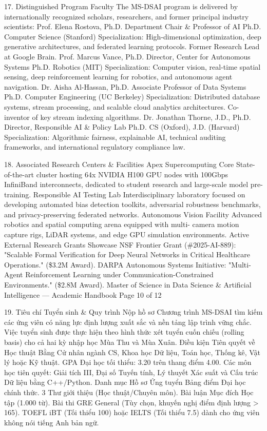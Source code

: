 \documentclass[12pt]{article}
\begin{document}
17. Distinguished Program Faculty
The MS-DSAI program is delivered by internationally recognized scholars, researchers, and former principal industry
scientists:
Prof. Elena Rostova, Ph.D.
Department Chair \& Professor of AI
Ph.D. Computer Science (Stanford)
Specialization: High-dimensional optimization, deep generative
architectures, and federated learning protocols. Former
Research Lead at Google Brain.
Prof. Marcus Vance, Ph.D.
Director, Center for Autonomous Systems
Ph.D. Robotics (MIT)
Specialization: Computer vision, real-time spatial sensing, deep
reinforcement learning for robotics, and autonomous agent
navigation.
Dr. Aisha Al-Hassan, Ph.D.
Associate Professor of Data Systems
Ph.D. Computer Engineering (UC Berkeley)
Specialization: Distributed database systems, stream
processing, and scalable cloud analytics architectures. Co-
inventor of key stream indexing algorithms.
Dr. Jonathan Thorne, J.D., Ph.D.
Director, Responsible AI \& Policy Lab
Ph.D. CS (Oxford), J.D. (Harvard)
Specialization: Algorithmic fairness, explainable AI, technical
auditing frameworks, and international regulatory compliance
law.

18. Associated Research Centers \& Facilities
Apex Supercomputing Core
State-of-the-art cluster hosting 64x
NVIDIA H100 GPU nodes with 100Gbps
InfiniBand interconnects, dedicated to
student research and large-scale model
pre-training.
Responsible AI Testing Lab
Interdisciplinary laboratory focused on
developing automated bias detection
toolkits, adversarial robustness
benchmarks, and privacy-preserving
federated networks.
Autonomous Vision Facility
Advanced robotics and spatial
computing arena equipped with multi-
camera motion capture rigs, LiDAR
systems, and edge GPU simulation
environments.
Active External Research Grants Showcase
NSF Frontier Grant (\#2025-AI-889): "Scalable Formal Verification for Deep Neural Networks in Critical Healthcare
Operations." (\$3.2M Award).
DARPA Autonomous Systems Initiative: "Multi-Agent Reinforcement Learning under Communication-Constrained
Environments." (\$2.8M Award).
Master of Science in Data Science \& Artificial Intelligence — Academic Handbook
Page 10 of 12


19. Tiêu chí Tuyển sinh \& Quy trình Nộp hồ sơ
Chương trình MS-DSAI tìm kiếm các ứng viên có năng lực định lượng xuất sắc và nền tảng lập trình vững chắc. Việc tuyển sinh được thực hiện theo hình thức xét tuyển cuốn chiếu (rolling basis) cho cả hai kỳ nhập học Mùa Thu và Mùa Xuân.
Điều kiện Tiên quyết về Học thuật
Bằng Cử nhân ngành CS, Khoa học Dữ liệu, Toán học, Thống kê,
Vật lý hoặc Kỹ thuật.
GPA Đại học tối thiểu: 3.20 trên thang điểm 4.00.
Các môn học tiên quyết: Giải tích III, Đại số Tuyến tính,
Lý thuyết Xác suất và Cấu trúc Dữ liệu bằng C++/Python.
Danh mục Hồ sơ Ứng tuyển
Bảng điểm Đại học chính thức.
3 Thư giới thiệu (Học thuật/Chuyên môn).
Bài luận Mục đích Học tập (1.000 từ).
Bài thi GRE General (Tùy chọn, khuyến nghị điểm định lượng > 165).
TOEFL iBT (Tối thiểu 100) hoặc IELTS (Tối thiểu 7.5) dành cho ứng viên
không nói tiếng Anh bản ngữ.
\end{document}
